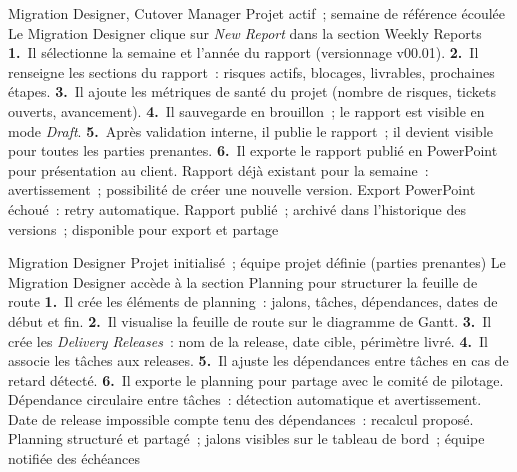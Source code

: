   {Migration Designer, Cutover Manager}
  {Projet actif~; semaine de référence écoulée}
  {Le Migration Designer clique sur \textit{New Report} dans la section Weekly Reports}
  {\textbf{1.}~Il sélectionne la semaine et l'année du rapport (versionnage v00.01).\newline
   \textbf{2.}~Il renseigne les sections du rapport~: risques actifs, blocages, livrables, prochaines étapes.\newline
   \textbf{3.}~Il ajoute les métriques de santé du projet (nombre de risques, tickets ouverts, avancement).\newline
   \textbf{4.}~Il sauvegarde en brouillon~; le rapport est visible en mode \textit{Draft}.\newline
   \textbf{5.}~Après validation interne, il publie le rapport~; il devient visible pour toutes les parties prenantes.\newline
   \textbf{6.}~Il exporte le rapport publié en PowerPoint pour présentation au client.}
  {Rapport déjà existant pour la semaine~: avertissement~; possibilité de créer une nouvelle version. Export PowerPoint échoué~: retry automatique.}
  {Rapport publié~; archivé dans l'historique des versions~; disponible pour export et partage}

  {Migration Designer}
  {Projet initialisé~; équipe projet définie (parties prenantes)}
  {Le Migration Designer accède à la section Planning pour structurer la feuille de route}
  {\textbf{1.}~Il crée les éléments de planning~: jalons, tâches, dépendances, dates de début et fin.\newline
   \textbf{2.}~Il visualise la feuille de route sur le diagramme de Gantt.\newline
   \textbf{3.}~Il crée les \textit{Delivery Releases}~: nom de la release, date cible, périmètre livré.\newline
   \textbf{4.}~Il associe les tâches aux releases.\newline
   \textbf{5.}~Il ajuste les dépendances entre tâches en cas de retard détecté.\newline
   \textbf{6.}~Il exporte le planning pour partage avec le comité de pilotage.}
  {Dépendance circulaire entre tâches~: détection automatique et avertissement. Date de release impossible compte tenu des dépendances~: recalcul proposé.}
  {Planning structuré et partagé~; jalons visibles sur le tableau de bord~; équipe notifiée des échéances}

